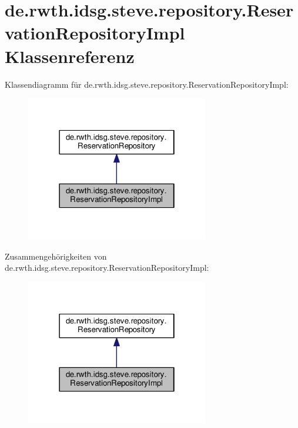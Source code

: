 \hypertarget{classde_1_1rwth_1_1idsg_1_1steve_1_1repository_1_1_reservation_repository_impl}{\section{de.\-rwth.\-idsg.\-steve.\-repository.\-Reservation\-Repository\-Impl Klassenreferenz}
\label{classde_1_1rwth_1_1idsg_1_1steve_1_1repository_1_1_reservation_repository_impl}
}


Klassendiagramm für de.\-rwth.\-idsg.\-steve.\-repository.\-Reservation\-Repository\-Impl\-:
\nopagebreak
\begin{figure}[H]
\begin{center}
\leavevmode
\includegraphics[width=226pt]{classde_1_1rwth_1_1idsg_1_1steve_1_1repository_1_1_reservation_repository_impl__inherit__graph}
\end{center}
\end{figure}


Zusammengehörigkeiten von de.\-rwth.\-idsg.\-steve.\-repository.\-Reservation\-Repository\-Impl\-:
\nopagebreak
\begin{figure}[H]
\begin{center}
\leavevmode
\includegraphics[width=226pt]{classde_1_1rwth_1_1idsg_1_1steve_1_1repository_1_1_reservation_repository_impl__coll__graph}
\end{center}
\end{figure}
